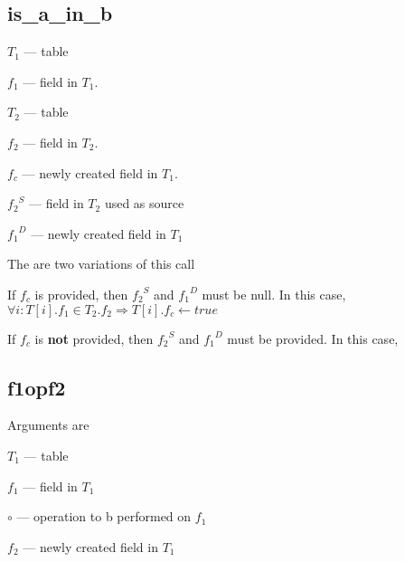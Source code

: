 \subsection{is\_a\_in\_b}
\label{is_a_in_b}

\be
\item \(T_1\) --- table
\item \(f_1\) --- field in \(T_1\). 
\item \(T_2\) --- table
\item \(f_2\) --- field in \(T_2\). 
\item \(f_c\) --- newly created field in \(T_1\). 
\item \({f_2}^S\) --- field in \(T_2\) used as source
\item \({f_1}^D\) --- newly created field in \(T_1\) 
\ee

The are two variations of this call
\be
\item If \(f_c\) is provided, then \({f_2}^S\) and \({f_1}^D\) must be
  null. In this case, 
\(\forall i: T[i].f_1 \in T_2.f_2 \Rightarrow T[i].f_c \leftarrow true\)
\item If \(f_c\) is {\bf not} provided, then \({f_2}^S\) and \({f_1}^D\) must be
  provided. In this case, 
  \TBC
\ee

\subsection{f1opf2}
\label{f1opf2}

Arguments are 
\be
\item \(T_1\) --- table
\item \(f_1\) --- field in \(T_1\)
\item \(\circ\)  --- operation to b performed on \(f_1\)
\item \(f_2\) --- newly created field in \(T_1\)
\ee

